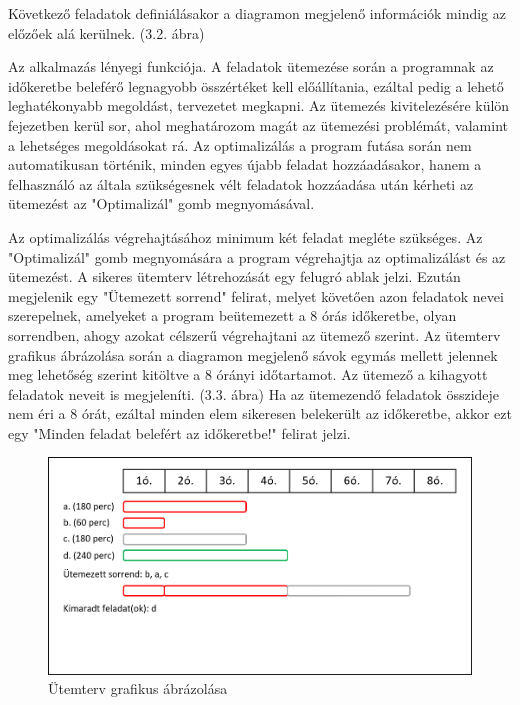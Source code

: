 Következő feladatok definiálásakor a diagramon megjelenő információk mindig az előzőek alá kerülnek. (3.2. ábra)


Az alkalmazás lényegi funkciója. A feladatok ütemezése során a programnak az időkeretbe beleférő legnagyobb összértéket kell előállítania, ezáltal pedig a lehető leghatékonyabb megoldást, tervezetet megkapni. Az ütemezés kivitelezésére külön fejezetben kerül sor, ahol meghatározom magát az ütemezési problémát, valamint a lehetséges megoldásokat rá. Az optimalizálás a program futása során nem automatikusan történik, minden egyes újabb feladat hozzáadásakor, hanem a felhasználó az általa szükségesnek vélt feladatok hozzáadása után kérheti az ütemezést az "Optimalizál" gomb megnyomásával.

Az optimalizálás végrehajtásához minimum két feladat megléte szükséges. Az "Optimalizál" gomb megnyomására a program végrehajtja az optimalizálást és az ütemezést. A sikeres ütemterv létrehozását egy felugró ablak jelzi. Ezután megjelenik egy "Ütemezett sorrend" felirat, melyet követően azon feladatok nevei szerepelnek, amelyeket a program beütemezett a 8 órás időkeretbe, olyan sorrendben, ahogy azokat célszerű végrehajtani az ütemező szerint. Az ütemterv grafikus ábrázolása során a diagramon megjelenő sávok egymás mellett jelennek meg lehetőség szerint kitöltve a 8 órányi időtartamot. Az ütemező a kihagyott feladatok neveit is megjeleníti. (3.3. ábra) Ha az ütemezendő feladatok összideje nem éri a 8 órát, ezáltal minden elem sikeresen belekerült az időkeretbe, akkor ezt egy "Minden feladat belefért az időkeretbe!" felirat jelzi.

\begin{figure}[h]
	\centering
	\includegraphics[scale=0.8]{images/scheduledTasks.png}
	\caption{Ütemterv grafikus ábrázolása}
\end{figure}



